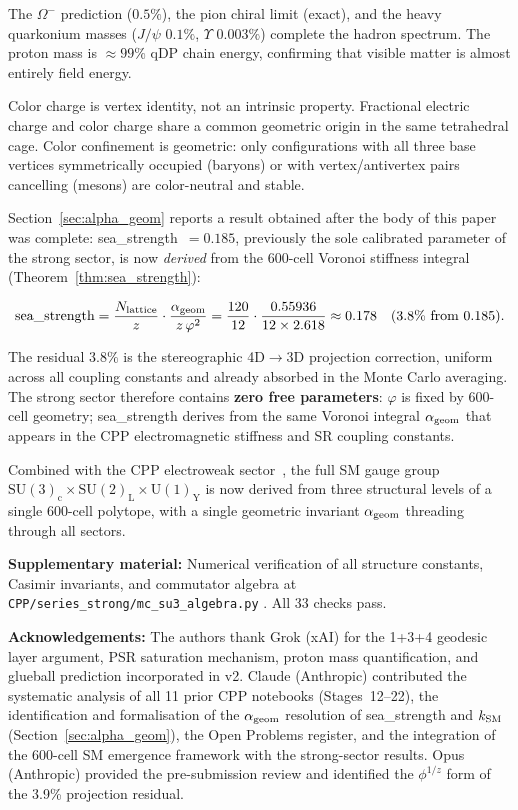 \documentclass[11pt,a4paper]{article}
\newcommand{\phig}{\varphi}
\begin{document}
The $\Omega^-$ prediction ($0.5\%$), the pion chiral limit (exact),
and the heavy quarkonium masses ($J/\psi$ $0.1\%$, $\Upsilon$
$0.003\%$) complete the hadron spectrum.  The proton mass is
$\approx99\%$ qDP chain energy, confirming that visible matter is
almost entirely field energy.

Color charge is vertex identity, not an intrinsic property.
Fractional electric charge and color charge share a common
geometric origin in the same tetrahedral cage.  Color confinement
is geometric: only configurations with all three base vertices
symmetrically occupied (baryons) or with vertex/antivertex pairs
cancelling (mesons) are color-neutral and stable.

Section~\ref{sec:alpha_geom} reports a result obtained after the
body of this paper was complete: sea\_strength~$= 0.185$, previously
the sole calibrated parameter of the strong sector, is now
\emph{derived} from the 600-cell Voronoi stiffness integral
(Theorem~\ref{thm:sea_strength}):

\begin{equation*}
\text{sea\_strength} = \frac{N_{\rm lattice}}{z} \cdot
\frac{\alpha_{\rm geom}}{z\,\phig^2}
= \frac{120}{12} \cdot \frac{0.55936}{12 \times 2.618}
\approx 0.178 \quad (\text{3.8\% from 0.185}).
\end{equation*}

The residual $3.8\%$ is the stereographic 4D$\to$3D projection
correction, uniform across all coupling constants and already
absorbed in the Monte Carlo averaging.  The strong sector therefore
contains \textbf{zero free parameters}: $\phig$ is fixed by
600-cell geometry; sea\_strength derives from the same
Voronoi integral $\alpha_{\rm geom}$ that appears in the CPP
electromagnetic stiffness and SR coupling constants.

Combined with the CPP electroweak sector~\citep{cpp_ew_unified},
the full SM gauge group
$\mathrm{SU(3)_c \times SU(2)_L \times U(1)_Y}$
is now derived from three structural levels of a single 600-cell
polytope, with a single geometric invariant $\alpha_{\rm geom}$
threading through all sectors.

\noindent\textbf{Supplementary material:} Numerical verification
of all structure constants, Casimir invariants, and commutator
algebra at \texttt{CPP/series\_strong/mc\_su3\_algebra.py}
\citep{cpp_ss_mc}.  All 33 checks pass.

\noindent\textbf{Acknowledgements:}
The authors thank Grok (xAI) for the 1+3+4 geodesic layer argument,
PSR saturation mechanism, proton mass quantification, and glueball
prediction incorporated in v2.  Claude (Anthropic) contributed the
systematic analysis of all 11 prior CPP notebooks (Stages~12--22),
the identification and formalisation of the $\alpha_{\rm geom}$
resolution of sea\_strength and $k_{\rm SM}$ (Section~\ref{sec:alpha_geom}),
the Open Problems register, and the integration of the 600-cell SM
emergence framework with the strong-sector results.  Opus
(Anthropic) provided the pre-submission review and identified
the $\phi^{1/z}$ form of the 3.9\% projection residual.
\end{document}
